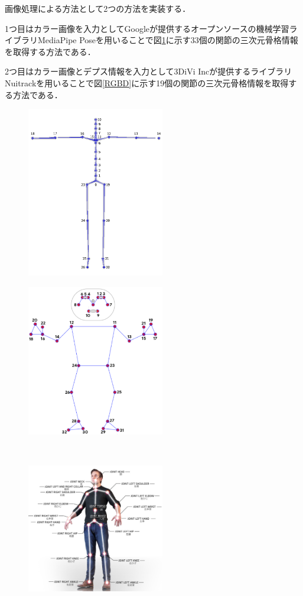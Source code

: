 \documentclass[a4j, fleqn, 12pt]{jsreport}
\begin{document}
画像処理による方法として2つの方法を実装する．

1つ目はカラー画像を入力としてGoogleが提供するオープンソースの機械学習ライブラリMediaPipe Poseを用いることで図\ref{RGB}に示す33個の関節の三次元骨格情報を取得する方法である．

2つ目はカラー画像とデプス情報を入力として3DiVi Incが提供するライブラリNuitrackを用いることで図\ref{RGBD}に示す19個の関節の三次元骨格情報を取得する方法である．

\begin{figure}[t]
  \centering
  \begin{minipage}[]{0.45\hsize}
    \centering
    \includegraphics[width=6cm]{img/TechSpec_02.png}
    \label{mocopi}
  \end{minipage}
  \begin{minipage}[]{0.45\hsize}
    \centering
    \includegraphics[width=6cm]{img/media.png}
    \label{RGB}
  \end{minipage}\\
  \begin{minipage}[]{0.45\hsize}
    \centering
    \includegraphics[width=6cm]{img/nuitrack.png}

\end{minipage}
\end{figure}
\end{document}
